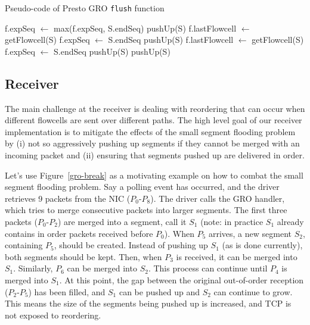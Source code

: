 \begin{algorithm}[t]
\caption{Pseudo-code of Presto GRO {\tt flush} function}
\label{alg:gro}
\begin{algorithmic}[1]
\STATE f.expSeq $\leftarrow$ max(f.expSeq, S.endSeq)
\STATE pushUp(S)
\STATE f.lastFlowcell $\leftarrow$ getFlowcell(S)
\STATE f.expSeq $\leftarrow$ S.endSeq
\STATE pushUp(S)
\STATE f.lastFlowcell $\leftarrow$ getFlowcell(S)
\STATE f.expSeq $\leftarrow$ S.endSeq
\STATE pushUp(S)
\ENDIF
\ELSE
\STATE pushUp(S)
\ENDIF
\ENDFOR
\ENDFOR
\end{algorithmic}
\end{algorithm}

\subsection{Receiver}
The main challenge at the receiver is dealing with reordering that can occur when different flowcells
are sent over different paths. The high level goal of our receiver implementation is
to mitigate the effects of the small segment flooding problem by (i) not so aggressively pushing
up segments if they cannot be merged with an incoming packet and (ii) ensuring that segments
pushed up are delivered in order.

 Let's use Figure~\ref{gro-break} as a motivating example 
on how to combat the small segment flooding problem. Say a polling event has occurred, and the driver retrieves
9 packets from the NIC ($P_0$-$P_8$). The driver calls the GRO handler, which tries to merge consecutive packets
into larger segments. The first three packets ($P_0$-$P_2$) are merged into a segment, call it $S_1$ (note: in practice
$S_1$ already contains in order packets received before $P_0$).
When $P_5$ arrives, a new segment $S_2$, containing $P_5$, should be created. Instead of pushing up $S_1$ (as is done currently),
both segments should be kept.
Then, when $P_3$ is received, it can be merged into $S_1$. Similarly, $P_6$ can be merged into $S_2$. This process
can continue until $P_4$ is merged into $S_1$. At this point, the gap between the original out-of-order reception ($P_2$-$P_5$)
 has been filled, and $S_1$ can be pushed up and $S_2$ can continue to grow. This means the size of the segments being pushed up is increased,
and TCP is not exposed to reordering.

